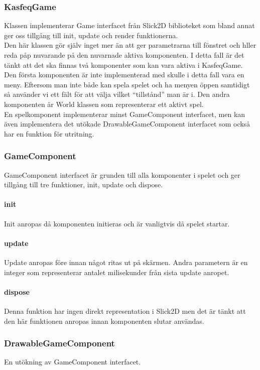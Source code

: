 \subsubsection{KasfeqGame}
Klassen implementerar Game interfacet från Slick2D biblioteket som bland annat ger oss tillgång till init, update och render funktionerna.\\
Den här klassen gör själv inget mer än att ger parametrarna till fönstret och hller reda påp nuvarande på den nuvarnade aktiva komponenten. I detta fall är det tänkt att det ska finnas två komponenter som kan vara aktiva i KasfeqGame. Den första komponenten är inte implementerad med skulle i detta fall vara en meny. Eftersom man inte både kan spela spelet och ha menyen öppen samtidigt så använder vi ett fält för att välja vilket ``tillstånd'' man är i. Den andra komponenten är World klassen som representerar ett aktivt spel.\\
En spelkomponent implementerar minst GameComponent interfacet, men kan även implementera det utökade DrawableGameComponent interfacet som också har en funktion för utritning.\\
\subsubsection{GameComponent}
GameComponent interfacet är grunden till alla komponenter i spelet och ger tillgång till tre funktioner, init, update och dispose.\\
\paragraph{init}
Init anropas då komponenten initieras och är vanligtvis då spelet startar.\\
\paragraph{update}
Update anropas före innan något ritas ut på skärmen. Andra parametern är en integer som representerar antalet milisekunder från sista update anropet.\\
\paragraph{dispose}
Denna funktion har ingen direkt representation i Slick2D men det är tänkt att den här funktionen anropas innan komponenten slutar användas.\\
\subsubsection{DrawableGameComponent}
En utökning av GameComponent interfacet.
